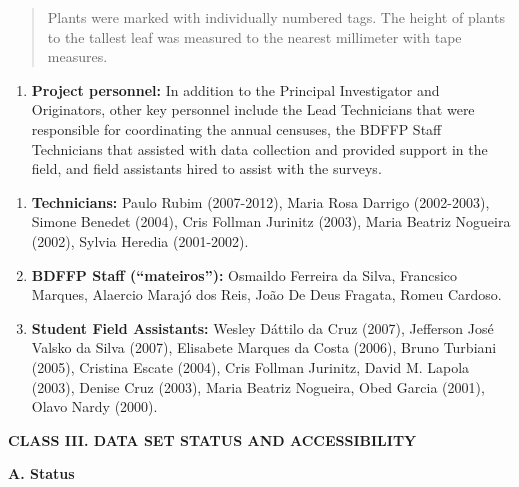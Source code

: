 \documentclass[
  english,
  man]{apa6}
\providecommand{\tightlist}{%
  \setlength{\itemsep}{0pt}\setlength{\parskip}{0pt}}
\begin{document}
\begin{quote}
Plants were marked with individually numbered tags. The height of
plants to the tallest leaf was measured to the nearest millimeter with
tape measures.
\end{quote}

\begin{enumerate}
\def\labelenumi{\arabic{enumi}.}
\setcounter{enumi}{2}
\tightlist
\item
  \textbf{Project personnel:} In addition to the Principal Investigator and
  Originators, other key personnel include the Lead Technicians that
  were responsible for coordinating the annual censuses, the BDFFP
  Staff Technicians that assisted with data collection and provided
  support in the field, and field assistants hired to assist with the
  surveys.
\end{enumerate}

\begin{enumerate}
\def\labelenumi{\alph{enumi}.}
\item
  \textbf{Technicians:} Paulo Rubim (2007-2012), Maria Rosa Darrigo
  (2002-2003), Simone Benedet (2004), Cris Follman Jurinitz (2003),
  Maria Beatriz Nogueira (2002), Sylvia Heredia (2001-2002).
\item
  \textbf{BDFFP Staff (``mateiros''):} Osmaildo Ferreira da Silva, Francsico
  Marques, Alaercio Marajó dos Reis, João De Deus Fragata, Romeu
  Cardoso.
\item
  \textbf{Student Field Assistants:} Wesley Dáttilo da Cruz (2007),
  Jefferson José Valsko da Silva (2007), Elisabete Marques da Costa
  (2006), Bruno Turbiani (2005), Cristina Escate (2004), Cris Follman
  Jurinitz, David M. Lapola (2003), Denise Cruz (2003), Maria Beatriz
  Nogueira, Obed Garcia (2001), Olavo Nardy (2000).
\end{enumerate}

\noindent  
\textbf{CLASS III. DATA SET STATUS AND ACCESSIBILITY}

\noindent  
\textbf{A. Status}
\end{document}

